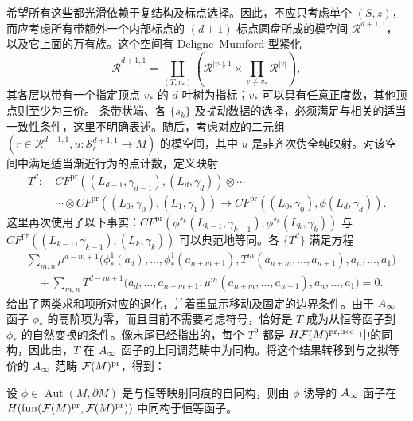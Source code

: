 希望所有这些都光滑依赖于复结构及标点选择。因此，不应只考虑单个 $(S,z)$，而应考虑所有带额外一个内部标点的 $(d+1)$ 标点圆盘所成的模空间 $\mathcal R^{d+1,1}$，以及它上面的万有族。这个空间有 Deligne–Mumford 型紧化
\begin{equation}\label{eq:10.7}
\overline{\mathcal R}^{d+1,1}=\coprod_{(T,v_*)}\left(\mathcal R^{|v_*|,1}\times\prod_{v\ne v_*}\mathcal R^{|v|}\right),
\end{equation}
其各层以带有一个指定顶点 $v_*$ 的 $d$ 叶树为指标；$v_*$ 可以具有任意正度数，其他顶点则至少为三价。
条带状端、各 $\{s_k\}$ 及扰动数据的选择，必须满足与相关的适当一致性条件，这里不明确表述。随后，考虑对应的二元组 $(r\in\mathcal R^{d+1,1},u:\mathcal S_r^{d+1,1}\to M)$ 的模空间，其中 $u$ 是非齐次伪全纯映射。对该空间中满足适当渐近行为的点计数，定义映射
\[
\begin{aligned}
T^d:\ &CF^{\mathrm{pr}}((L_{d-1},\gamma_{d-1}),(L_d,\gamma_d))\otimes\cdots\\
&\cdots\otimes CF^{\mathrm{pr}}((L_0,\gamma_0),(L_1,\gamma_1))
\longrightarrow CF^{\mathrm{pr}}((L_0,\gamma_0),\phi(L_d,\gamma_d)).
\end{aligned}
\]
这里再次使用了以下事实：$CF^{\mathrm{pr}}(\phi^{s_k}(L_{k-1},\gamma_{k-1}),\phi^{s_k}(L_k,\gamma_k))$ 与 $CF^{\mathrm{pr}}((L_{k-1},\gamma_{k-1}),(L_k,\gamma_k))$ 可以典范地等同。各 $\{T^d\}$ 满足方程
\begin{equation}\label{eq:10.8}
\begin{aligned}
&\sum_{m,n}\mu^{d-m+1}\bigl(\phi_*^1(a_d),\ldots,\phi_*^1(a_{n+m+1}),
T^m(a_{n+m},\ldots,a_{n+1}),a_n,\ldots,a_1\bigr)\\
&\quad+\sum_{m,n}T^{d-m+1}\bigl(a_d,\ldots,a_{n+m+1},
\mu^m(a_{n+m},\ldots,a_{n+1}),a_n,\ldots,a_1\bigr)=0.
\end{aligned}
\end{equation}
 给出了两类求和项所对应的退化，并着重显示移动及固定的边界条件。由于 $A_\infty$ 函子 $\phi_*$ 的高阶项为零，而且目前不需要考虑符号，恰好是 $T$ 成为从恒等函子到 $\phi_*$ 的自然变换的条件。像末尾已经指出的，每个 $T^0$ 都是 $H\mathcal F(M)^{\mathrm{pr},\mathrm{free}}$ 中的同构，因此由，$T$ 在 $A_\infty$ 函子的上同调范畴中为同构。将这个结果转移到与之拟等价的 $A_\infty$ 范畴 $\mathcal F(M)^{\mathrm{pr}}$，得到：
\begin{proposition}\label{st:10.3}
设 $\phi\in\operatorname{Aut}(M,\partial M)$ 是与恒等映射同痕的自同构，则由 $\phi$ 诱导的 $A_\infty$ 函子在 $H(\operatorname{fun}(\mathcal F(M)^{\mathrm{pr}},\allowbreak\mathcal F(M)^{\mathrm{pr}}))$ 中同构于恒等函子。
\end{proposition}
